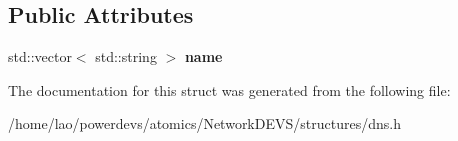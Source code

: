 \subsection*{Public Attributes}
\begin{DoxyCompactItemize}
\item 
std\+::vector$<$ std\+::string $>$ {\bfseries name}\hypertarget{structdns_1_1DomainName_a36d2107b7c6e3c78eb233244d22102ca}{}\label{structdns_1_1DomainName_a36d2107b7c6e3c78eb233244d22102ca}

\end{DoxyCompactItemize}


The documentation for this struct was generated from the following file\+:\begin{DoxyCompactItemize}
\item 
/home/lao/powerdevs/atomics/\+Network\+D\+E\+V\+S/structures/dns.\+h\end{DoxyCompactItemize}
